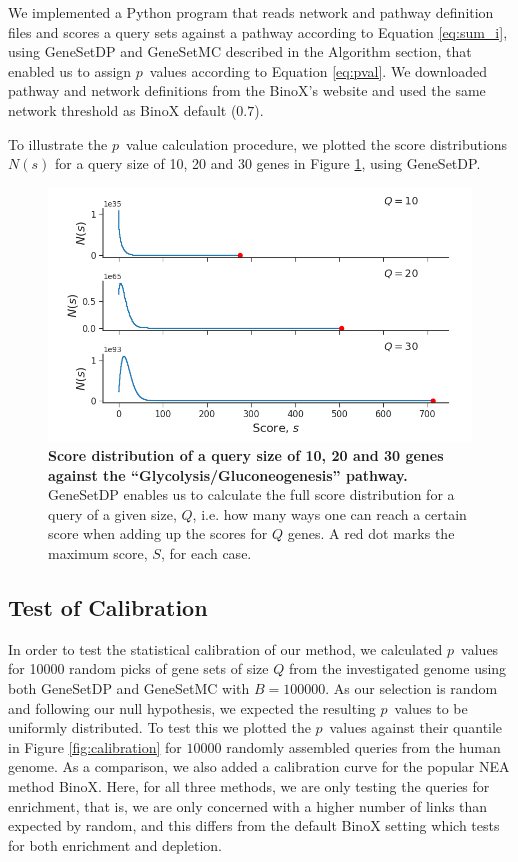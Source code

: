 \documentclass[a4paper,american]{lipics-v2016}
\begin{document}
We implemented a Python program that reads network and pathway definition files and scores a query sets against a pathway according to Equation \ref{eq:sum_i}, using GeneSetDP and GeneSetMC described in the Algorithm section, that enabled us to assign $p$~values according to Equation \ref{eq:pval}. We downloaded pathway and network definitions from the BinoX's website and used the same network threshold as BinoX default ($0.7$).

To illustrate the $p$~value calculation procedure, we plotted the score distributions $N(s)$ for a query size of 10, 20 and 30 genes in Figure \ref{fig:score_dist}, using GeneSetDP.

\begin{figure}[htb]
	\begin{center}
		\includegraphics[width=1.0\textwidth]{figures/score_distribuition_multiple.png}
    \end{center}
  \caption{{\bf Score distribution of a query size of 10, 20 and 30 genes against the ``Glycolysis/Gluconeogenesis'' pathway.} GeneSetDP enables us to calculate the full score distribution for a query of a given size, $Q$, i.e. how many ways one can reach a certain score when adding up the scores for $Q$ genes. A red dot marks the maximum score, $S$, for each case.}
  \label{fig:score_dist}
\end{figure}

\subsection*{Test of Calibration}

In order to test the statistical calibration of our method, we calculated $p$~values for 10000 random picks of gene sets of size $Q$ from the investigated genome using both GeneSetDP and GeneSetMC with $B = 100000$. As our selection is random and following our null hypothesis, we expected the resulting $p$~values to be uniformly distributed. To test this we plotted the $p$~values against their quantile in Figure \ref{fig:calibration} for $10000$ randomly assembled queries from the human genome. As a comparison, we also added a calibration curve for the popular NEA method BinoX\cite{ogris2016novel}. Here, for all three methods, we are only testing the queries for enrichment, that is, we are only concerned with a higher number of links than expected by random, and this differs from the default BinoX setting which tests for both enrichment and depletion.
\end{document}
